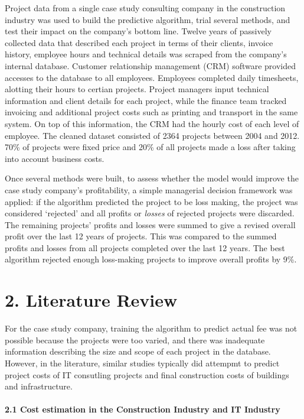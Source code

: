 \documentclass[]{elsarticle} %
\begin{document}
Project data from a single case study consulting company in the
construction industry was used to build the predictive algorithm, trial
several methods, and test their impact on the company's bottom line.
Twelve years of passively collected data that described each project in
terms of their clients, invoice history, employee hours and technical
details was scraped from the company's internal database. Customer
relationship management (CRM) software provided accesses to the database
to all employees. Employees completed daily timesheets, alotting their
hours to certian projects. Project managers input technical information
and client details for each project, while the finance team tracked
invoicing and additional project costs such as printing and transport in
the same system. On top of this information, the CRM had the hourly cost
of each level of employee. The cleaned dataset consisted of 2364
projects between 2004 and 2012. 70\% of projects were fixed price and
20\% of all projects made a loss after taking into account business
costs.

Once several methods were built, to assess whether the model would
improve the case study company's profitability, a simple managerial
decision framework was applied: if the algorithm predicted the project
to be loss making, the project was considered `rejected' and all profits
or \emph{losses} of rejected projects were discarded. The remaining
projects' profits and losses were summed to give a revised overall
profit over the last 12 years of projects. This was compared to the
summed profits and losses from all projects completed over the last 12
years. The best algorithm rejected enough loss-making projects to
improve overall profits by 9\%.

\section{2. Literature Review}\label{literature-review}

For the case study company, training the algorithm to predict actual fee
was not possible because the projects were too varied, and there was
inadequate information describing the size and scope of each project in
the database. However, in the literature, similar studies typically did
attempmt to predict project costs of IT consutling projects and final
construction costs of buildings and infrastructure.

\paragraph{2.1 Cost estimation in the Construction Industry and IT
Industry}\label{cost-estimation-in-the-construction-industry-and-it-industry}
\end{document}
